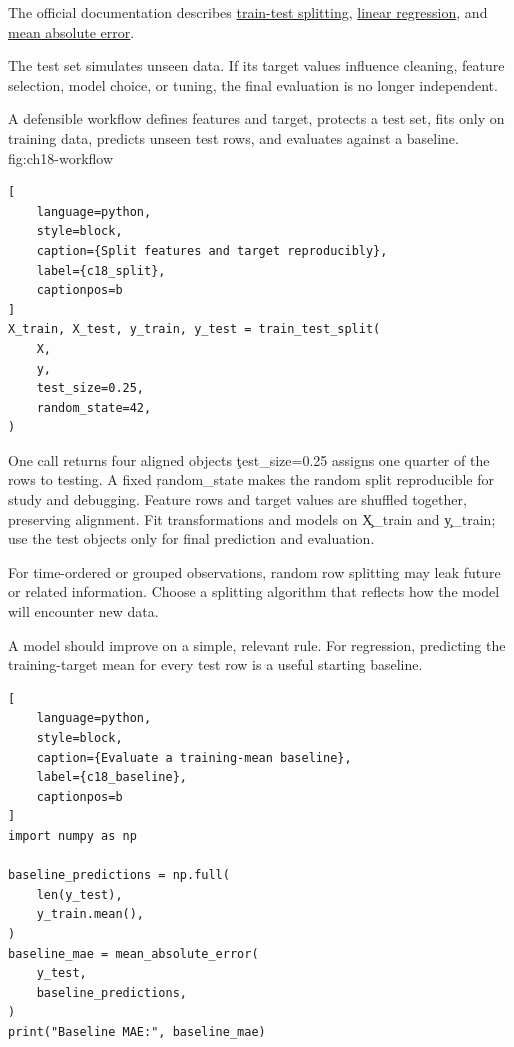 The official documentation describes
\href{https://scikit-learn.org/stable/modules/generated/sklearn.model_selection.train_test_split.html}{train-test splitting},
\href{https://scikit-learn.org/stable/modules/generated/sklearn.linear_model.LinearRegression.html}{linear regression},
and
\href{https://scikit-learn.org/stable/modules/generated/sklearn.metrics.mean_absolute_error.html}{mean absolute error}.


The test set simulates unseen data. If its target values influence cleaning,
feature selection, model choice, or tuning, the final evaluation is no longer
independent.

{A defensible workflow defines features and target, protects a test set, fits only on training data, predicts unseen test rows, and evaluates against a baseline.}
{fig:ch18-workflow}

\begin{lstlisting}[
    language=python,
    style=block,
    caption={Split features and target reproducibly},
    label={c18_split},
    captionpos=b
]
X_train, X_test, y_train, y_test = train_test_split(
    X,
    y,
    test_size=0.25,
    random_state=42,
)
\end{lstlisting}

\begin{SyntaxBox}{One call returns four aligned objects}
\c{test_size=0.25} assigns one quarter of the rows to testing. A fixed
\c{random_state} makes the random split reproducible for study and debugging.
Feature rows and target values are shuffled together, preserving alignment.
Fit transformations and models on \c{X_train} and \c{y_train}; use the test
objects only for final prediction and evaluation.
\end{SyntaxBox}

For time-ordered or grouped observations, random row splitting may leak future
or related information. Choose a splitting algorithm that reflects how the
model will encounter new data.


A model should improve on a simple, relevant rule. For regression, predicting
the training-target mean for every test row is a useful starting baseline.

\begin{lstlisting}[
    language=python,
    style=block,
    caption={Evaluate a training-mean baseline},
    label={c18_baseline},
    captionpos=b
]
import numpy as np

baseline_predictions = np.full(
    len(y_test),
    y_train.mean(),
)
baseline_mae = mean_absolute_error(
    y_test,
    baseline_predictions,
)
print("Baseline MAE:", baseline_mae)
\end{lstlisting}


